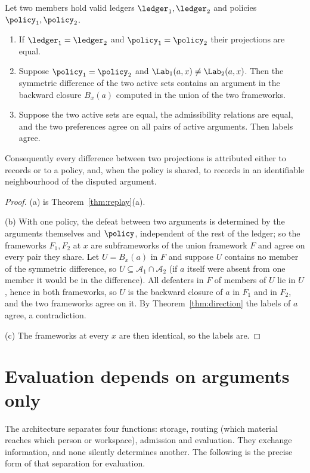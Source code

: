 \begin{theorem}\label{thm:trace}
Let two members hold valid ledgers $\ledger_1,\ledger_2$ and policies $\policy_1,\policy_2$.
\begin{enumerate}[label=(\alph*)]
\item If $\ledger_1=\ledger_2$ and $\policy_1=\policy_2$ their projections are equal.
\item Suppose $\policy_1=\policy_2$ and $\Lab_1(a,x)\ne\Lab_2(a,x)$. Then the symmetric difference of the two active sets contains an argument in the backward closure $B_x(a)$ computed in the union of the two frameworks.
\item Suppose the two active sets are equal, the admissibility relations are equal, and the two preferences agree on all pairs of active arguments. Then labels agree.
\end{enumerate}
Consequently every difference between two projections is attributed either to records or to a policy, and, when the policy is shared, to records in an identifiable neighbourhood of the disputed argument.
\end{theorem}

\begin{proof}
(a) is Theorem~\ref{thm:replay}(a).

(b) With one policy, the defeat between two arguments is determined by the arguments themselves and $\policy$, independent of the rest of the ledger; so the frameworks $F_1,F_2$ at $x$ are subframeworks of the union framework $F$ and agree on every pair they share. Let $U=B_x(a)$ in $F$ and suppose $U$ contains no member of the symmetric difference, so $U\subseteq\mathcal A_1\cap\mathcal A_2$ (if $a$ itself were absent from one member it would be in the difference). All defeaters in $F$ of members of $U$ lie in $U$, hence in both frameworks, so $U$ is the backward closure of $a$ in $F_1$ and in $F_2$, and the two frameworks agree on it. By Theorem~\ref{thm:direction} the labels of $a$ agree, a contradiction.

(c) The frameworks at every $x$ are then identical, so the labels are.
\end{proof}

\section{Evaluation depends on arguments only}\label{sec:separation}

The architecture separates four functions: storage, routing (which material reaches which person or workspace), admission and evaluation. They exchange information, and none silently determines another. The following is the precise form of that separation for evaluation.


